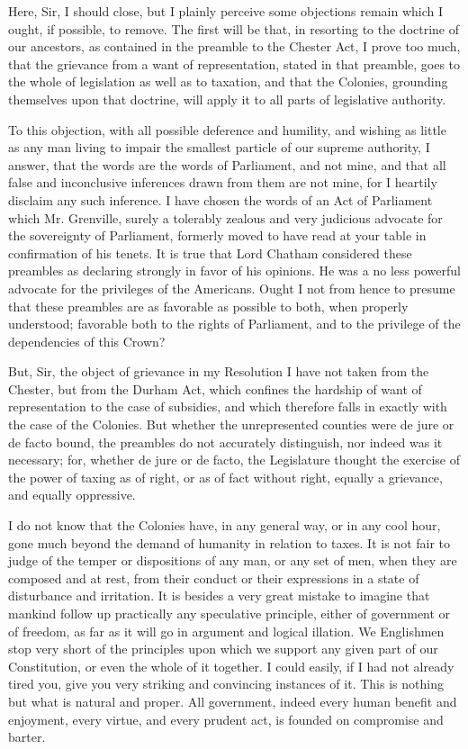 Here, Sir, I should close, but I plainly perceive some objections remain which I ought, if possible, to remove. The first will be that, in resorting to the doctrine of our ancestors, as contained in the preamble to the Chester Act, I prove too much, that the grievance from a want of representation, stated in that preamble, goes to the whole of legislation as well as to taxation, and that the Colonies, grounding themselves upon that doctrine, will apply it to all parts of legislative authority.\par

To this objection, with all possible deference and humility, and wishing as little as any man living to impair the smallest particle of our supreme authority, I answer, that the words are the words of Parliament, and not mine, and that all false and inconclusive inferences drawn from them are not mine, for I heartily disclaim any such inference. I have chosen the words of an Act of Parliament which Mr. Grenville, surely a tolerably zealous and very judicious advocate for the sovereignty of Parliament, formerly moved to have read at your table in confirmation of his tenets. It is true that Lord Chatham considered these preambles as declaring strongly in favor of his opinions. He was a no less powerful advocate for the privileges of the Americans. Ought I not from hence to presume that these preambles are as favorable as possible to both, when properly understood; favorable both to the rights of Parliament, and to the privilege of the dependencies of this Crown?\par

But, Sir, the object of grievance in my Resolution I have not taken from the Chester, but from the Durham Act, which confines the hardship of want of representation to the case of subsidies, and which therefore falls in exactly with the case of the Colonies. But whether the unrepresented counties were de jure or de facto bound, the preambles do not accurately distinguish, nor indeed was it necessary; for, whether de jure or de facto, the Legislature thought the exercise of the power of taxing as of right, or as of fact without right, equally a grievance, and equally oppressive.\par

I do not know that the Colonies have, in any general way, or in any cool hour, gone much beyond the demand of humanity in relation to taxes. It is not fair to judge of the temper or dispositions of any man, or any set of men, when they are composed and at rest, from their conduct or their expressions in a state of disturbance and irritation. It is besides a very great mistake to imagine that mankind follow up practically any speculative principle, either of government or of freedom, as far as it will go in argument and logical illation. We Englishmen stop very short of the principles upon which we support any given part of our Constitution, or even the whole of it together. I could easily, if I had not already tired you, give you very striking and convincing instances of it. This is nothing but what is natural and proper. All government, indeed every human benefit and enjoyment, every virtue, and every prudent act, is founded on compromise and barter.\par

